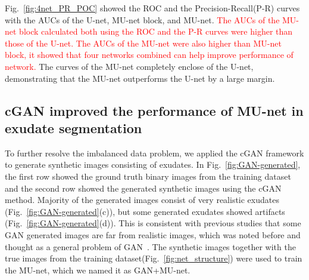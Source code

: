 \documentclass{osa-article}
\begin{document}
Fig.~\ref{fig:4net_PR_POC} showed the ROC and the Precision-Recall(P-R) curves with the AUCs of the U-net, MU-net block, and MU-net. \textcolor{red}{The AUCs of the MU-net block calculated both using the ROC and the P-R curves were higher than those of the U-net. The AUCs of the MU-net were also higher than MU-net block, it showed that four networks  combined can help improve performance of network.} The curves of the MU-net completely enclose of the U-net, demonstrating that the MU-net outperforms the U-net by a large margin. 


\subsection{cGAN improved the performance of MU-net in exudate segmentation}
 
To further resolve the imbalanced data problem, we applied the cGAN framework to generate synthetic images consisting of exudates. In Fig.~\ref{fig:GAN-generated}, the first row showed the ground truth binary images from the training dataset and the second row showed the generated synthetic images using the cGAN method. Majority of the generated images consist of very realistic exudates (Fig.~\ref{fig:GAN-generated}(c)), but some generated exudates showed artifacts (Fig.~\ref{fig:GAN-generated}(d)). This is consistent with previous studies that some GAN generated images are far from realistic images, which was noted before and thought as a general problem of GAN~\cite{isola2016image}. The synthetic images together with the true images from the training dataset(Fig.~\ref{fig:net_structure}) were used to train the MU-net, which we named it as GAN+MU-net. 
\end{document}
